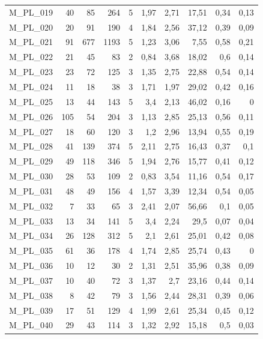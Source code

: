 \begin{table}[htbp]
\begin{tabular}{lrrrrrrrrr}
    M\_PL\_019 & 40   & 85   & 264  & 5    & 1,97 & 2,71 & 17,51 & 0,34 & 0,13 \\
    M\_PL\_020 & 20   & 91   & 190  & 4    & 1,84 & 2,56 & 37,12 & 0,39 & 0,09 \\
    M\_PL\_021 & 91   & 677  & 1193 & 5    & 1,23 & 3,06 & 7,55 & 0,58 & 0,21 \\
    M\_PL\_022 & 21   & 45   & 83   & 2    & 0,84 & 3,68 & 18,02 & 0,6  & 0,14 \\
    M\_PL\_023 & 23   & 72   & 125  & 3    & 1,35 & 2,75 & 22,88 & 0,54 & 0,14 \\
    M\_PL\_024 & 11   & 18   & 38   & 3    & 1,71 & 1,97 & 29,02 & 0,42 & 0,16 \\
    M\_PL\_025 & 13   & 44   & 143  & 5    & 3,4  & 2,13 & 46,02 & 0,16 & 0 \\
    M\_PL\_026 & 105  & 54   & 204  & 3    & 1,13 & 2,85 & 25,13 & 0,56 & 0,11 \\
    M\_PL\_027 & 18   & 60   & 120  & 3    & 1,2  & 2,96 & 13,94 & 0,55 & 0,19 \\
    M\_PL\_028 & 41   & 139  & 374  & 5    & 2,11 & 2,75 & 16,43 & 0,37 & 0,1 \\
    M\_PL\_029 & 49   & 118  & 346  & 5    & 1,94 & 2,76 & 15,77 & 0,41 & 0,12 \\
    M\_PL\_030 & 28   & 53   & 109  & 2    & 0,83 & 3,54 & 11,16 & 0,54 & 0,17 \\
    M\_PL\_031 & 48   & 49   & 156  & 4    & 1,57 & 3,39 & 12,34 & 0,54 & 0,05 \\
    M\_PL\_032 & 7    & 33   & 65   & 3    & 2,41 & 2,07 & 56,66 & 0,1  & 0,05 \\
    M\_PL\_033 & 13   & 34   & 141  & 5    & 3,4  & 2,24 & 29,5 & 0,07 & 0,04 \\
    M\_PL\_034 & 26   & 128  & 312  & 5    & 2,1  & 2,61 & 25,01 & 0,42 & 0,08 \\
    M\_PL\_035 & 61   & 36   & 178  & 4    & 1,74 & 2,85 & 25,74 & 0,43 & 0 \\
    M\_PL\_036 & 10   & 12   & 30   & 2    & 1,31 & 2,51 & 35,96 & 0,38 & 0,09 \\
    M\_PL\_037 & 10   & 40   & 72   & 3    & 1,37 & 2,7  & 23,16 & 0,44 & 0,14 \\
    M\_PL\_038 & 8    & 42   & 79   & 3    & 1,56 & 2,44 & 28,31 & 0,39 & 0,06 \\
    M\_PL\_039 & 17   & 51   & 129  & 4    & 1,99 & 2,61 & 25,34 & 0,45 & 0,12 \\
    M\_PL\_040 & 29   & 43   & 114  & 3    & 1,32 & 2,92 & 15,18 & 0,5  & 0,03 \\

\end{tabular}
\end{table}
